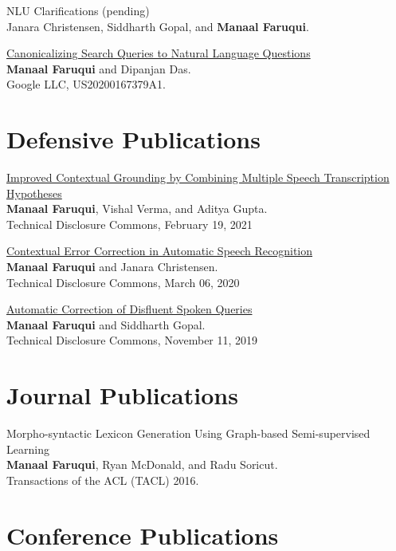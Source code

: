 \documentclass[margin,line]{res}
\begin{document}
\begin{resume}
NLU Clarifications (pending)\\
Janara Christensen, Siddharth Gopal, and \textbf{Manaal Faruqui}.

\href{https://patents.google.com/patent/US20200167379A1/en}{Canonicalizing Search Queries to Natural Language Questions}\\
\textbf{Manaal Faruqui} and Dipanjan Das.\\
Google LLC, US20200167379A1.

\section{\sc Defensive Publications}
\href{https://www.tdcommons.org/dpubs_series/4082/}{Improved Contextual Grounding by Combining Multiple Speech Transcription Hypotheses}\\
\textbf{Manaal Faruqui}, Vishal Verma, and Aditya Gupta.\\
Technical Disclosure Commons, February 19, 2021

\href{https://www.tdcommons.org/dpubs_series/2989/}{Contextual Error Correction in Automatic Speech Recognition}\\
\textbf{Manaal Faruqui} and Janara Christensen.\\
Technical Disclosure Commons, March 06, 2020

\href{https://www.tdcommons.org/dpubs_series/2661/}{Automatic Correction of Disfluent Spoken Queries}\\
\textbf{Manaal Faruqui} and Siddharth Gopal.\\
Technical Disclosure Commons, November 11, 2019

\section{\sc Journal Publications}

Morpho-syntactic Lexicon Generation Using Graph-based Semi-supervised Learning\\
\textbf{Manaal Faruqui}, Ryan McDonald, and Radu Soricut.\\
Transactions of the ACL (TACL) 2016.

\vspace{.2cm}
\section{\sc Conference Publications}


\end{resume}
\end{document}
